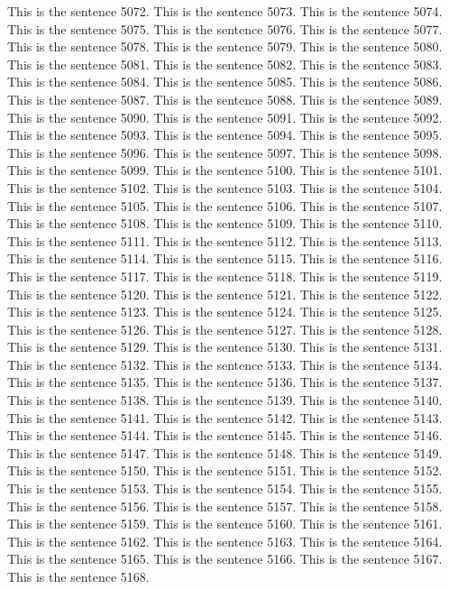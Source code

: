 \documentclass{article}
\begin{document}
This is the sentence 5072.
This is the sentence 5073.
This is the sentence 5074.
This is the sentence 5075.
This is the sentence 5076.
This is the sentence 5077.
This is the sentence 5078.
This is the sentence 5079.
This is the sentence 5080.
This is the sentence 5081.
This is the sentence 5082.
This is the sentence 5083.
This is the sentence 5084.
This is the sentence 5085.
This is the sentence 5086.
This is the sentence 5087.
This is the sentence 5088.
This is the sentence 5089.
This is the sentence 5090.
This is the sentence 5091.
This is the sentence 5092.
This is the sentence 5093.
This is the sentence 5094.
This is the sentence 5095.
This is the sentence 5096.
This is the sentence 5097.
This is the sentence 5098.
This is the sentence 5099.
This is the sentence 5100.
This is the sentence 5101.
This is the sentence 5102.
This is the sentence 5103.
This is the sentence 5104.
This is the sentence 5105.
This is the sentence 5106.
This is the sentence 5107.
This is the sentence 5108.
This is the sentence 5109.
This is the sentence 5110.
This is the sentence 5111.
This is the sentence 5112.
This is the sentence 5113.
This is the sentence 5114.
This is the sentence 5115.
This is the sentence 5116.
This is the sentence 5117.
This is the sentence 5118.
This is the sentence 5119.
This is the sentence 5120.
This is the sentence 5121.
This is the sentence 5122.
This is the sentence 5123.
This is the sentence 5124.
This is the sentence 5125.
This is the sentence 5126.
This is the sentence 5127.
This is the sentence 5128.
This is the sentence 5129.
This is the sentence 5130.
This is the sentence 5131.
This is the sentence 5132.
This is the sentence 5133.
This is the sentence 5134.
This is the sentence 5135.
This is the sentence 5136.
This is the sentence 5137.
This is the sentence 5138.
This is the sentence 5139.
This is the sentence 5140.
This is the sentence 5141.
This is the sentence 5142.
This is the sentence 5143.
This is the sentence 5144.
This is the sentence 5145.
This is the sentence 5146.
This is the sentence 5147.
This is the sentence 5148.
This is the sentence 5149.
This is the sentence 5150.
This is the sentence 5151.
This is the sentence 5152.
This is the sentence 5153.
This is the sentence 5154.
This is the sentence 5155.
This is the sentence 5156.
This is the sentence 5157.
This is the sentence 5158.
This is the sentence 5159.
This is the sentence 5160.
This is the sentence 5161.
This is the sentence 5162.
This is the sentence 5163.
This is the sentence 5164.
This is the sentence 5165.
This is the sentence 5166.
This is the sentence 5167.
This is the sentence 5168.
\end{document}
